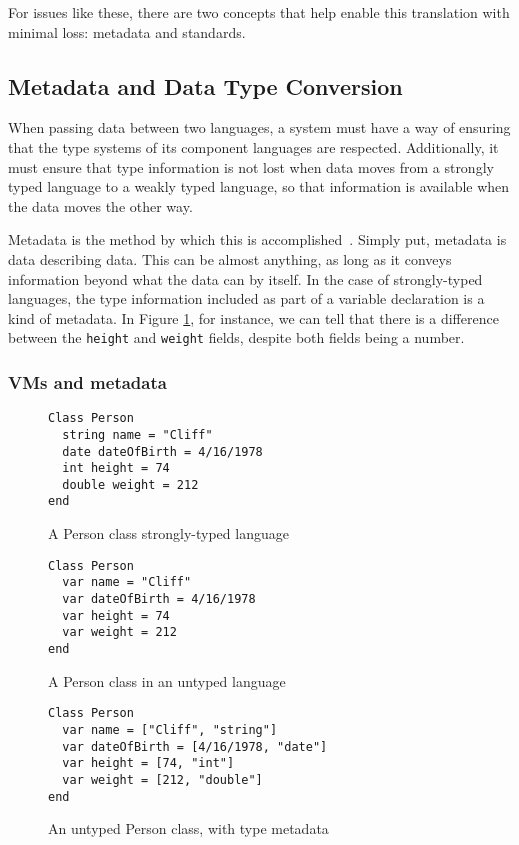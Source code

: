 \documentclass{sig-alternate}
\begin{document}
For issues like these, there are two concepts that help enable this translation with minimal loss: metadata and standards.
\subsection{Metadata and Data Type Conversion}\label{metadata}
When passing data between two languages, a system must have a way of ensuring that the type systems of its component languages are respected. Additionally, it must ensure that type information is not lost when data moves from a strongly typed language to a weakly typed language, so that information is available when the data moves the other way.

Metadata is the method by which this is accomplished~\cite{Ide:2010}. Simply put, metadata is data describing data.
This can be almost anything, as long as it conveys information beyond what the data can by itself. In the case of strongly-typed languages, the type information included as part of a variable declaration is a kind of metadata. In Figure \ref{typedExample}, for instance, we can tell that there is a difference between the {\tt height} and {\tt weight} fields, despite both fields being a number.


\subsubsection*{VMs and metadata}

\begin{figure}
\begin{verbatim}
Class Person
  string name = "Cliff"
  date dateOfBirth = 4/16/1978
  int height = 74
  double weight = 212
end
\end{verbatim}
\caption{A Person class strongly-typed language}
\label{typedExample}
\end{figure}

\begin{figure}
\begin{verbatim}
Class Person
  var name = "Cliff"
  var dateOfBirth = 4/16/1978
  var height = 74
  var weight = 212
end
\end{verbatim}
\caption{A Person class in an untyped language}
\label{untypedExample}
\end{figure}

\begin{figure}
\begin{verbatim}
Class Person
  var name = ["Cliff", "string"]
  var dateOfBirth = [4/16/1978, "date"]
  var height = [74, "int"]
  var weight = [212, "double"]
end
\end{verbatim}
\caption{An untyped Person class, with type metadata}
\label{untypedMeta}
\end{figure}
\end{document}
